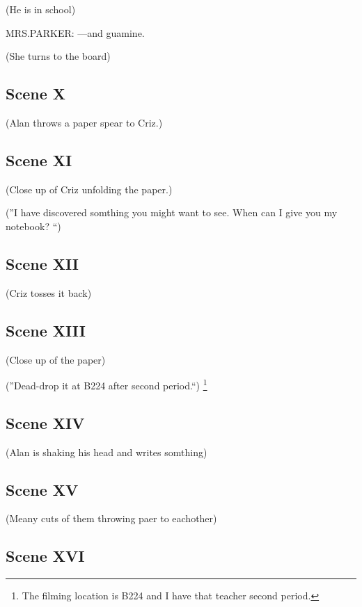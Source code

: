 \documentclass{article}
\begin{document}
(He is in school)

\noindent
MRS.PARKER: ---and guamine.

\noindent
(She turns to the board)

\subsection[010 - X]{Scene X}

(Alan throws a paper spear to Criz.)

\subsection[011 - XI]{Scene XI}

(Close up of Criz unfolding the paper.)

\noindent
(''I have discovered somthing you might want to see. When can I give you my notebook? ``)

\subsection[012 - XII]{Scene XII}

(Criz tosses it back)

\subsection[013 - XIII]{Scene XIII}

(Close up of the paper)

\noindent
(''Dead-drop it at B224 after second period.``)
\footnote{The filming location is B224 and I have that teacher second period.}

\subsection[014 - XIV]{Scene XIV}

(Alan is shaking his head and writes somthing)

\subsection[015 - XV]{Scene XV}

(Meany cuts of them throwing paer to eachother)

\subsection[016 - XVI]{Scene XVI}
\end{document}
